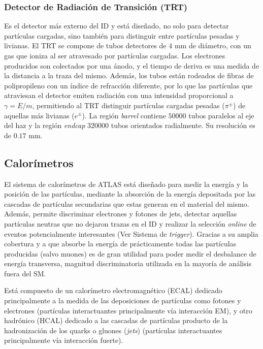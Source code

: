 
\subsubsection{Detector de Radiación de Transición (TRT)}

Es el detector más externo del ID y está diseñado, no solo para detectar partículas cargadas, sino también para distinguir entre partículas pesadas y livianas. El TRT se compone de tubos detectores de $4$ mm de diámetro, con un gas que ioniza al ser atravesado por partículas cargadas. Los electrones producidos son colectados por una ánodo, y el tiempo de deriva es una medida de la distancia a la traza del mismo. Además, los tubos están rodeados de fibras de polipropileno con un índice de refracción diferente, por lo que las partículas que atraviesan el detector emiten radiación con una intensidad proporcional a $\gamma=E/m$, permitiendo al TRT  distinguir partículas cargadas pesadas ($\pi^{\pm}$) de aquellas más livianas ($e^{\pm}$). La región \textit{barrel} contiene $50000$ tubos paralelos al eje del haz y la región \textit{endcap} $320000$ tubos orientados radialmente. Su resolución es de $0.17$ mm.

\subsection{Calorímetros}


El sistema de calorímetros de ATLAS está diseñado para medir la energía y la posición de las partículas, mediante la absorción de la energía depositada por las cascadas de partículas secundarias que estas generan en el material del mismo. Además, permite discriminar electrones y fotones de jets, detectar aquellas partículas neutras que no dejaron trazas en el ID y realizar la selección \textit{online} de eventos potencialmente interesantes (Ver Sistema de \textit{trigger}). Gracias a su amplia cobertura y a que absorbe la energía de prácticamente todas las partículas producidas (salvo muones) es de gran utilidad para poder medir el desbalance de energía transversa, magnitud discriminatoria utilizada en la mayoría de análisis fuera del SM.

Está compuesto de un calorímetro electromagnético (ECAL) dedicado principalmente a la medida de las deposiciones de partículas como fotones y electrones (partículas interactuantes principalmente vía interacción EM), y otro hadrónico (HCAL) dedicado a las cascadas de partículas producto de la hadronización de los quarks o gluones (\textit{jets}) (partículas interactuantes principalmente vía interacción fuerte).

